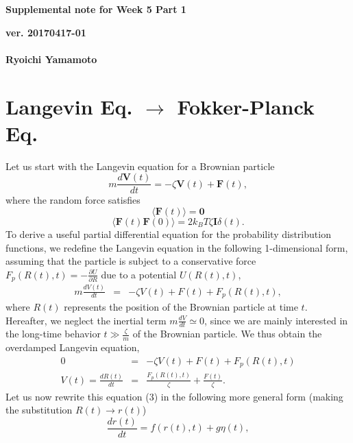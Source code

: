 \documentclass[a4paper,11pt]{article}
\begin{document}
\begin{center}
  {\LARGE\bf Supplemental note for Week 5 Part 1}
  \end{center}
\begin{flushright}
  {\large\bf ver. 20170417-01}\\
 \ \\
{\large\bf Ryoichi Yamamoto}\\
\end{flushright}

\section{Langevin Eq. $\rightarrow$ Fokker-Planck Eq.}

Let us start with the Langevin equation for a Brownian particle
\begin{equation}
m\frac{d\mathbf{V}(t)}{dt}=-\zeta\mathbf{V}(t)+\mathbf{F}(t),\tag{F2}
\end{equation}
where the random force satisfies
\begin{equation}
\langle\mathbf{F}(t)\rangle=\mathbf{0}\tag{F3}
\end{equation}
\begin{equation}
\langle\mathbf{F}(t)\mathbf{F}(0)\rangle=2k_BT\zeta\mathbf{I}\delta(t).\tag{F4}
\end{equation}
To derive a useful partial differential equation for the probability
distribution functions, we redefine the
Langevin equation in the following 1-dimensional form, assuming that the particle is subject to a conservative force $F_p(R(t),t)=-\frac{\partial U}{\partial R}$ due to a potential $U(R(t),t)$,
\begin{eqnarray}
m\frac{dV(t)}{dt}&=&-\zeta V(t)+F(t)+F_{p}(R(t),t),
\end{eqnarray}
where $R(t)$ represents the position of the Brownian particle at time $t$.
\\
Hereafter, we neglect the inertial term $m\frac{dV}{dt}\simeq 0$, since
we are mainly interested in the long-time behavior
$t\gg\frac{\zeta}{m}$ of the Brownian particle.
We thus obtain the overdamped Langevin equation,
\begin{eqnarray}
0&=&-\zeta V(t)+F(t)+F_{p}(R(t),t)\\
V(t)=\frac{dR(t)}{dt}&=&\frac{F_p(R(t),t)}{\zeta}+\frac{F(t)}{\zeta}.
\end{eqnarray}
Let us now rewrite this equation (3) in the following more general
form (making the substitution $R(t)\longrightarrow r(t)$)
\begin{equation}
\frac{dr(t)}{dt}=f(r(t),t)+g\eta(t),
\end{equation}
\end{document}
